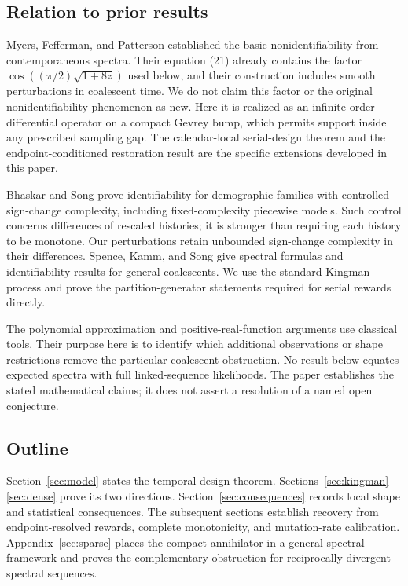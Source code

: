 \documentclass[11pt]{article}
\theoremstyle{definition}
\theoremstyle{remark}
\numberwithin{equation}{section}
\begin{document}
\subsection{Relation to prior results}

Myers, Fefferman, and Patterson \cite{MFP} established the basic
nonidentifiability from contemporaneous spectra. Their equation (21)
already contains the factor
$\cos((\pi/2)\sqrt{1+8z})$ used below, and their construction includes
smooth perturbations in coalescent time. We do not claim this factor or
the original nonidentifiability phenomenon as new. Here it is realized
as an infinite-order differential operator on a compact Gevrey bump,
which permits support inside any prescribed sampling gap. The
calendar-local serial-design theorem and the endpoint-conditioned
restoration result are the specific extensions developed in this paper.

Bhaskar and Song \cite{BS} prove identifiability for demographic families
with controlled sign-change complexity, including fixed-complexity
piecewise models. Such control concerns differences of rescaled histories;
it is stronger than requiring each history to be monotone. Our
perturbations retain unbounded sign-change complexity in their
differences. Spence, Kamm, and Song \cite{SKS} give spectral formulas and
identifiability results for general coalescents. We use the standard
Kingman process and prove the partition-generator statements required
for serial rewards directly.

The polynomial approximation and positive-real-function arguments use
classical tools. Their purpose here is to identify which additional
observations or shape restrictions remove the particular coalescent
obstruction. No result below equates expected spectra with full
linked-sequence likelihoods. The paper establishes the stated mathematical
claims; it does not assert a resolution of a named open conjecture.

\subsection{Outline}

Section~\ref{sec:model} states the temporal-design theorem.
Sections~\ref{sec:kingman}--\ref{sec:dense} prove its two directions.
Section~\ref{sec:consequences} records local shape and statistical
consequences. The subsequent sections establish recovery from
endpoint-resolved rewards, complete monotonicity, and mutation-rate
calibration. Appendix~\ref{sec:sparse} places the compact annihilator in
a general spectral framework and proves the complementary obstruction
for reciprocally divergent spectral sequences.
\end{document}

